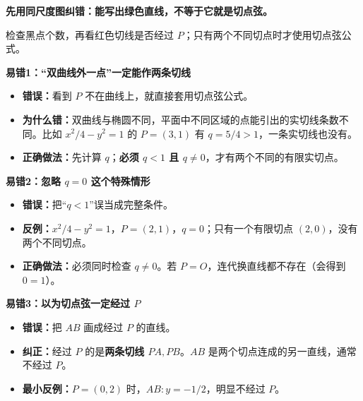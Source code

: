 \begin{trapbox}
\begin{minipage}{\linewidth}
\textbf{先用同尺度图纠错：能写出绿色直线，不等于它就是切点弦。}
\begin{center}

\end{center}\end{minipage}

检查黑点个数，再看红色切线是否经过 $P$；只有两个不同切点时才使用切点弦公式。

\begin{minipage}{\linewidth}
\textbf{\textcolor{CTrap}{易错1：“双曲线外一点”一定能作两条切线}}
\begin{itemize}[leftmargin=*,itemsep=0.25em]
\item \textbf{错误：}看到 $P$ 不在曲线上，就直接套用切点弦公式。
\item \textbf{为什么错：}双曲线与椭圆不同，平面中不同区域的点能引出的实切线条数不同。比如 $x^2/4-y^2=1$ 的 $P=(3,1)$ 有 $q=5/4>1$，一条实切线也没有。
\item \textbf{正确做法：}先计算 $q$；\textbf{必须 $q<1$ 且 $q\ne0$}，才有两个不同的有限实切点。
\end{itemize}\end{minipage}


\medskip
\begin{minipage}{\linewidth}
\textbf{\textcolor{CTrap}{易错2：忽略 $q=0$ 这个特殊情形}}
\begin{itemize}[leftmargin=*,itemsep=0.25em]
\item \textbf{错误：}把“$q<1$”误当成完整条件。
\item \textbf{反例：}$x^2/4-y^2=1$，$P=(2,1)$，$q=0$；只有一个有限切点 $(2,0)$，没有两个不同切点。
\item \textbf{正确做法：}必须同时检查 $q\ne0$。若 $P=O$，连代换直线都不存在（会得到 $0=1$）。
\end{itemize}\end{minipage}


\medskip
\begin{minipage}{\linewidth}
\textbf{\textcolor{CTrap}{易错3：以为切点弦一定经过 $P$}}
\begin{itemize}[leftmargin=*,itemsep=0.25em]
\item \textbf{错误：}把 $AB$ 画成经过 $P$ 的直线。
\item \textbf{纠正：}经过 $P$ 的是\textbf{两条切线 $PA,PB$}。$AB$ 是两个切点连成的另一直线，通常不经过 $P$。
\item \textbf{最小反例：}$P=(0,2)$ 时，$AB:y=-1/2$，明显不经过 $P$。
\end{itemize}\end{minipage}



\end{trapbox}
